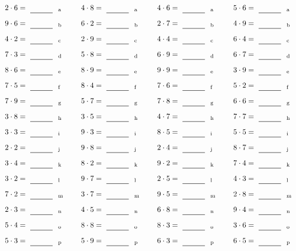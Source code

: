 \documentclass
[
  draft    = true,
  fontsize = 11pt,
  parskip  = half-
]
{scrartcl}
\begin{document}
\par\vfill\par
\begin{align*}
    \pline{2\cdot6}&=\rline{a}
  & \pline{4\cdot8}&=\rline{a}
  & \pline{4\cdot6}&=\rline{a}
  & \pline{5\cdot6}&=\rline{a} \\[1ex]
    \pline{9\cdot6}&=\rline{b}
  & \pline{6\cdot2}&=\rline{b}
  & \pline{2\cdot7}&=\rline{b}
  & \pline{4\cdot9}&=\rline{b} \\[1ex]
    \pline{4\cdot2}&=\rline{c}
  & \pline{2\cdot9}&=\rline{c}
  & \pline{4\cdot4}&=\rline{c}
  & \pline{6\cdot4}&=\rline{c} \\[1ex]
    \pline{7\cdot3}&=\rline{d}
  & \pline{5\cdot8}&=\rline{d}
  & \pline{6\cdot9}&=\rline{d}
  & \pline{6\cdot7}&=\rline{d} \\[1ex]
    \pline{8\cdot6}&=\rline{e}
  & \pline{8\cdot9}&=\rline{e}
  & \pline{9\cdot9}&=\rline{e}
  & \pline{3\cdot9}&=\rline{e} \\[1ex]
    \pline{7\cdot5}&=\rline{f}
  & \pline{8\cdot4}&=\rline{f}
  & \pline{7\cdot6}&=\rline{f}
  & \pline{5\cdot2}&=\rline{f} \\[1ex]
    \pline{7\cdot9}&=\rline{g}
  & \pline{5\cdot7}&=\rline{g}
  & \pline{7\cdot8}&=\rline{g}
  & \pline{6\cdot6}&=\rline{g} \\[1ex]
    \pline{3\cdot8}&=\rline{h}
  & \pline{3\cdot5}&=\rline{h}
  & \pline{4\cdot7}&=\rline{h}
  & \pline{7\cdot7}&=\rline{h} \\[1ex]
    \pline{3\cdot3}&=\rline{i}
  & \pline{9\cdot3}&=\rline{i}
  & \pline{8\cdot5}&=\rline{i}
  & \pline{5\cdot5}&=\rline{i} \\[1ex]
    \pline{2\cdot2}&=\rline{j}
  & \pline{9\cdot8}&=\rline{j}
  & \pline{2\cdot4}&=\rline{j}
  & \pline{8\cdot7}&=\rline{j} \\[1ex]
    \pline{3\cdot4}&=\rline{k}
  & \pline{8\cdot2}&=\rline{k}
  & \pline{9\cdot2}&=\rline{k}
  & \pline{7\cdot4}&=\rline{k} \\[1ex]
    \pline{3\cdot2}&=\rline{l}
  & \pline{9\cdot7}&=\rline{l}
  & \pline{2\cdot5}&=\rline{l}
  & \pline{4\cdot3}&=\rline{l} \\[1ex]
    \pline{7\cdot2}&=\rline{m}
  & \pline{3\cdot7}&=\rline{m}
  & \pline{9\cdot5}&=\rline{m}
  & \pline{2\cdot8}&=\rline{m} \\[1ex]
    \pline{2\cdot3}&=\rline{n}
  & \pline{4\cdot5}&=\rline{n}
  & \pline{6\cdot8}&=\rline{n}
  & \pline{9\cdot4}&=\rline{n} \\[1ex]
    \pline{5\cdot4}&=\rline{o}
  & \pline{8\cdot8}&=\rline{o}
  & \pline{8\cdot3}&=\rline{o}
  & \pline{3\cdot6}&=\rline{o} \\[1ex]
    \pline{5\cdot3}&=\rline{p}
  & \pline{5\cdot9}&=\rline{p}
  & \pline{6\cdot3}&=\rline{p}
  & \pline{6\cdot5}&=\rline{p}
\end{align*}
\end{document}
